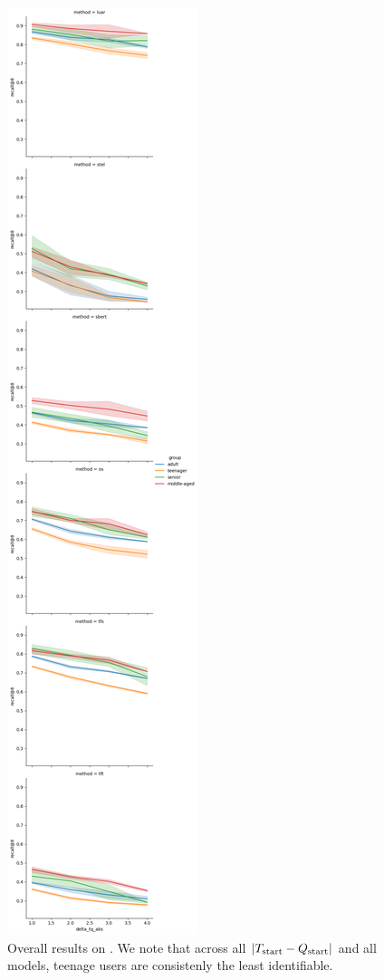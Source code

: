 \begin{figure}[h]
    \centering
    \includegraphics[height=0.8\textheight]{stylometryExtensions/figures/demo/varydelta_demographic_groupwise_age.png}
    \caption{Overall results on \DSagevary{}. We note that across all $|T_{\rm{start}} - Q_{\rm{start}}|$ and all models, teenage users are consistenly the least identifiable.}
    \label{fig:demographic_vary:age}
\end{figure}

